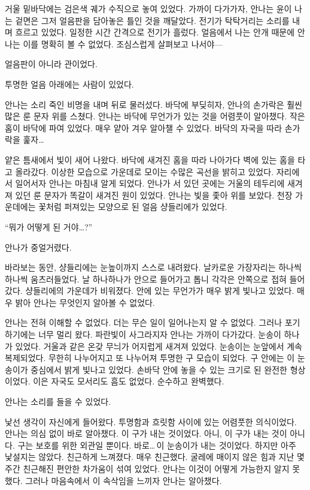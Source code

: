 거울 밑바닥에는 검은색 궤가 수직으로 놓여 있었다. 가까이 다가가자, 안나는 윤이 나는 겉면은 그저 얼음판을 담아놓은 틀인 것을 깨달았다. 전기가 탁탁거리는 소리를 내며 흐르고 있었다. 일정한 시간 간격으로 전기가 흘렀다. 얼음에서 나는 안개 때문에 안나는 이를 명확히 볼 수 없었다. 조심스럽게 살펴보고 나서야—

얼음판이 아니라 관이었다.

투명한 얼음 아래에는 사람이 있었다.

안나는 소리 죽인 비명을 내며 뒤로 물러섰다. 바닥에 부딪히자, 안나의 손가락은 훨씬 많은 룬 문자 위를 스쳤다. 안나는 바닥에 무언가가 있는 것을 어렴풋이 알아챘다. 작은 홈이 바닥에 파여 있었다. 매우 얕아 겨우 알아챌 수 있었다. 바닥의 자국을 따라 손가락을 훑자\ldots

얕은 틈새에서 빛이 새어 나왔다. 바닥에 새겨진 홈을 따라 나아가다 벽에 있는 홈을 타고 올라갔다. 이상한 모습으로 가운데로 모이는 수많은 곡선을 밝히고 있었다. 자리에서 일어서자 안나는 마침내 알게 되었다. 안나가 서 있던 곳에는 거울의 테두리에 새겨져 있던 룬 문자가 똑갈이 새겨진 원이 있었다. 안나는 빛을 좇아 위를 보았다. 천장 가운데에는 꽃처럼 퍼져있는 모양으로 된 얼음 샹들리에가 있었다.

``뭐가 어떻게 된 거야\ldots?''

안나가 중얼거렸다.

바라보는 동안, 샹들리에는 눈높이까지 스스로 내려왔다. 날카로운 가장자리는 하나씩 하나씩 움츠러들었다. 날 하나하나가 안으로 들어가고 톱니 각각은 안쪽으로 접혀 들어갔다. 샹들리에의 가운데가 비워졌다. 안에 있는 무언가가 매우 밝게 빛나고 있었다. 매우 밝아 안나는 무엇인지 알아볼 수 없었다.

안나는 전혀 이해할 수 없었다. 더는 무슨 일이 일어나는지 알 수 없었다. 그러나 포기하기에는 너무 멀리 왔다. 파란빛이 사그라지자 안나는 가까이 다가갔다. 눈송이 하나가 있었다. 거울과 같은 온갖 무늬가 어지럽게 새겨져 있었다. 눈송이는 눈앞에서 계속 복제되었다. 무한히 나누어지고 또 나누어져 투명한 구 모습이 되었다. 구 안에는 이 눈송이가 중심에서 밝게 빛나고 있었다. 손바닥 안에 놓을 수 있는 크기로 된 완전한 형상이었다. 이은 자국도 모서리도 흠도 없었다. 순수하고 완벽했다.

안나는 소리를 들을 수 있었다.

낯선 생각이 자신에게 들어왔다. 투명함과 흐릿함 사이에 있는 어렴풋한 의식이었다. 안나는 의심 없이 바로 알아챘다. 이 구가 내는 것이었다. 아니, 이 구가 내는 것이 아니다. 구는 보호를 위한 외관일 뿐이다. 바로\ldots\,이 눈송이가 내는 것이었다. 하지만 아주 낯설지는 않았다. 친근하게 느껴졌다. 매우 친근했다. 굴레에 매이지 않은 힘과 지난 몇 주간 친근해진 편안한 차가움이 섞여 있었다. 안나는 이것이 어떻게 가능한지 알지 못했다. 그러나 마음속에서 이 속삭임을 느끼자 안나는 알아챘다.

